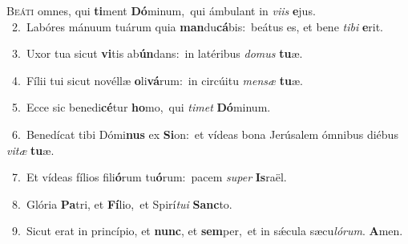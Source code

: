 \lettrine{\initial\textcolor{\initialcolor}{B}}{eáti} omnes, qui \textbf{ti}\-ment \textbf{Dó}\-minum,~\star qui ámbulant in \textit{vi}\-\textit{is} \textbf{e}\-jus.\\
{\numbfont\textcolor{\numbcolor}{~2.}}~Labóres mánuum tuárum quia \textbf{man}\-du\-\textbf{cá}\-bis:~\star beátus es, et bene \textit{ti}\-\textit{bi} \textbf{e}\-rit.\par
{\numbfont\textcolor{\numbcolor}{~3.}}~Uxor tua sicut \textbf{vi}\-tis ab\-\textbf{ún}\-dans:~\star in latéribus \textit{do}\-\textit{mus} \textbf{tu}\-æ.\par
{\numbfont\textcolor{\numbcolor}{~4.}}~Fílii tui sicut novéllæ \textbf{o}\-li\-\textbf{vá}\-rum:~\star in circúitu \textit{men}\-\textit{sæ} \textbf{tu}\-æ.\par
{\numbfont\textcolor{\numbcolor}{~5.}}~Ecce sic benedi\-\textbf{cé}\-tur \textbf{ho}\-mo,~\star qui \textit{ti}\-\textit{met} \textbf{Dó}\-minum.\par
{\numbfont\textcolor{\numbcolor}{~6.}}~Benedícat tibi Dómi\textbf{nus} ex \textbf{Si}\-on:~\star et vídeas bona Jerúsalem ómnibus diébus \textit{vi}\-\textit{tæ} \textbf{tu}\-æ.\par
{\numbfont\textcolor{\numbcolor}{~7.}}~Et vídeas fílios fili\-\textbf{ó}\-rum tu\-\textbf{ó}\-rum:~\star pacem \textit{su}\-\textit{per} \textbf{Is}\-raël.\par
{\numbfont\textcolor{\numbcolor}{~8.}}~Glória \textbf{Pa}\-tri, et \textbf{Fí}\-lio,~\star et Spirí\-\textit{tu}\-\textit{i} \textbf{Sanc}\-to.\par
{\numbfont\textcolor{\numbcolor}{~9.}}~Sicut erat in princípio, et \textbf{nunc}\-, et \textbf{sem}\-per,~\star et in sǽcula sæcu\-\textit{ló}\-\textit{rum}. \textbf{A}\-men.\par

